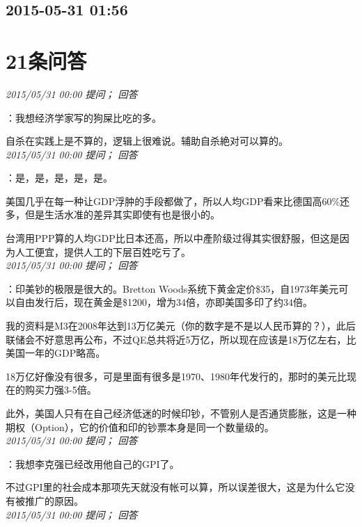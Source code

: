 \documentclass[twocolumn]{ctexart}
\begin{document}
\subsection{2015-05-31 01:56}


\section{21条问答}

\textit{\hfill\noindent\small 2015/05/31 00:00 提问； 回答}

：我想经济学家写的狗屎比吃的多。

自杀在实践上是不算的，逻辑上很难说。辅助自杀絶对可以算的。\\

\textit{\hfill\noindent\small 2015/05/31 00:00 提问； 回答}

：是，是，是，是，是。

美国几乎在每一种让GDP浮肿的手段都做了，所以人均GDP看来比德国高60\%还多，但是生活水准的差异其实即使有也是很小的。

台湾用PPP算的人均GDP比日本还高，所以中產阶级过得其实很舒服，但这是因为人工便宜，提供人工的下层百姓吃亏了。\\

\textit{\hfill\noindent\small 2015/05/31 00:00 提问； 回答}

：印美钞的极限是很大的。Bretton Woods系统下黄金定价\$35，自1973年美元可以自由发行后，现在黄金是\$1200，增为34倍，亦即美国多印了约34倍。

我的资料是M3在2008年达到13万亿美元（你的数字是不是以人民币算的？），此后联储会不好意思再公布，不过QE总共将近5万亿，所以现在应该是18万亿左右，比美国一年的GDP略高。

18万亿好像没有很多，可是里面有很多是1970、1980年代发行的，那时的美元比现在的购买力强3-5倍。

此外，美国人只有在自己经济低迷的时候印钞，不管别人是否通货膨胀，这是一种期权（Option），它的价值和印的钞票本身是同一个数量级的。\\

\textit{\hfill\noindent\small 2015/05/31 00:00 提问； 回答}

：我想李克强已经改用他自己的GPI了。

不过GPI里的社会成本那项先天就没有帐可以算，所以误差很大，这是为什么它没有被推广的原因。\\

\textit{\hfill\noindent\small 2015/05/31 00:00 提问； 回答}
\end{document}
